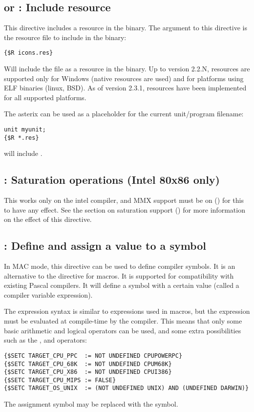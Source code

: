 \subsection{ or  : Include resource}
This directive includes a resource in the binary. The argument to this directive is the resource
file to include in the binary:
\begin{verbatim}
{$R icons.res}
\end{verbatim}
Will include the file  as a resource in the binary. Up to
version 2.2.N, resources are supported only for Windows (native resources are used) 
and for platforms using ELF binaries (linux, BSD). As of version 2.3.1,
resources have been implemented for all supported platforms.

The asterix can be used as a placeholder for the current unit/program filename:
\begin{verbatim}
unit myunit;
{$R *.res}
\end{verbatim}
will include .

\subsection{ : Saturation operations (Intel 80x86 only)}

This works only on the intel compiler, and MMX support must be on
() for this to have any effect. See the section on
saturation support () for more information
on the effect of this directive.

\subsection{ : Define and assign a value to a symbol}

In MAC mode, this directive can be used to define compiler symbols. It is
an alternative to the  directive for macros. It is supported for 
compatibility with existing \macos Pascal compilers. It will define a symbol
with a certain value (called a compiler variable expression). 

The expression syntax is similar to expressions used in macros, but the
expression must be evaluated at compile-time by the compiler. This means
that only some basic arithmetic and logical operators can be used,
and some extra possibilities such as the , and 
operators:
\begin{verbatim}
{$SETC TARGET_CPU_PPC  := NOT UNDEFINED CPUPOWERPC}
{$SETC TARGET_CPU_68K  := NOT UNDEFINED CPUM68K}
{$SETC TARGET_CPU_X86  := NOT UNDEFINED CPUI386}
{$SETC TARGET_CPU_MIPS := FALSE}
{$SETC TARGET_OS_UNIX  := (NOT UNDEFINED UNIX) AND (UNDEFINED DARWIN)}
\end{verbatim}
The \var{:=} assignment symbol may be replaced with the \var{=} symbol.

